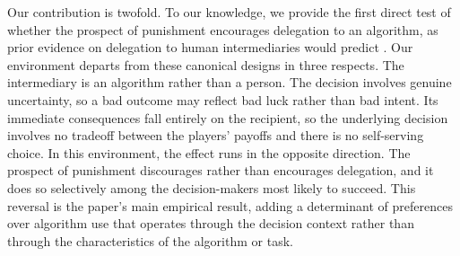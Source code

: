 
Our contribution is twofold. To our knowledge, we provide the first direct test of whether the prospect of punishment encourages delegation to an algorithm, as prior evidence on delegation to human intermediaries would predict \citep{bartling_shifting_2012, hamman_self-interest_2010, coffman_intermediation_2011, oexl_shifting_2013}. Our environment departs from these canonical designs in three respects. The intermediary is an algorithm rather than a person. The decision involves genuine uncertainty, so a bad outcome may reflect bad luck rather than bad intent. Its immediate consequences fall entirely on the recipient, so the underlying decision involves no tradeoff between the players’ payoffs and there is no self-serving choice. In this environment, the effect runs in the opposite direction. The prospect of punishment discourages rather than encourages delegation, and it does so selectively among the decision-makers most likely to succeed. This reversal is the paper's main empirical result, adding a determinant of preferences over algorithm use that operates through the decision context rather than through the characteristics of the algorithm or task.

